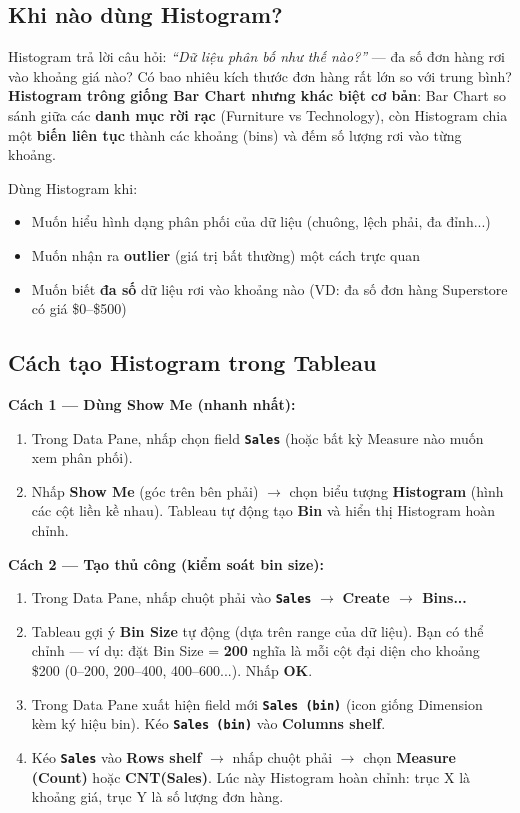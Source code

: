\documentclass[12pt]{article}
\begin{document}
\subsection{Khi nào dùng Histogram?}

\noindent Histogram trả lời câu hỏi: \textit{``Dữ liệu phân bố như thế nào?''} --- đa số đơn hàng rơi vào khoảng giá nào? Có bao nhiêu kích thước đơn hàng rất lớn so với trung bình? \textbf{Histogram trông giống Bar Chart nhưng khác biệt cơ bản}: Bar Chart so sánh giữa các \textbf{danh mục rời rạc} (Furniture vs Technology), còn Histogram chia một \textbf{biến liên tục} thành các khoảng (bins) và đếm số lượng rơi vào từng khoảng.

\noindent Dùng Histogram khi:
\begin{itemize}[nosep]
    \item Muốn hiểu hình dạng phân phối của dữ liệu (chuông, lệch phải, đa đỉnh...)
    \item Muốn nhận ra \textbf{outlier} (giá trị bất thường) một cách trực quan
    \item Muốn biết \textbf{đa số} dữ liệu rơi vào khoảng nào (VD: đa số đơn hàng Superstore có giá \$0--\$500)
\end{itemize}

\subsection{Cách tạo Histogram trong Tableau}

\noindent \textbf{Cách 1 --- Dùng Show Me (nhanh nhất):}
\begin{enumerate}[nosep]
    \item Trong Data Pane, nhấp chọn field \textbf{\texttt{Sales}} (hoặc bất kỳ Measure nào muốn xem phân phối).
    \item Nhấp \textbf{Show Me} (góc trên bên phải) $\rightarrow$ chọn biểu tượng \textbf{Histogram} (hình các cột liền kề nhau). Tableau tự động tạo \textbf{Bin} và hiển thị Histogram hoàn chỉnh.
\end{enumerate}

\noindent \textbf{Cách 2 --- Tạo thủ công (kiểm soát bin size):}
\begin{enumerate}[nosep]
    \item Trong Data Pane, nhấp chuột phải vào \textbf{\texttt{Sales}} $\rightarrow$ \textbf{Create $\rightarrow$ Bins...}
    \item Tableau gợi ý \textbf{Bin Size} tự động (dựa trên range của dữ liệu). Bạn có thể chỉnh --- ví dụ: đặt Bin Size = \textbf{200} nghĩa là mỗi cột đại diện cho khoảng \$200 (0--200, 200--400, 400--600...). Nhấp \textbf{OK}.
    \item Trong Data Pane xuất hiện field mới \textbf{\texttt{Sales (bin)}} (icon giống Dimension kèm ký hiệu bin). Kéo \textbf{\texttt{Sales (bin)}} vào \textbf{Columns shelf}.
    \item Kéo \textbf{\texttt{Sales}} vào \textbf{Rows shelf} $\rightarrow$ nhấp chuột phải $\rightarrow$ chọn \textbf{Measure (Count)} hoặc \textbf{CNT(Sales)}. Lúc này Histogram hoàn chỉnh: trục X là khoảng giá, trục Y là số lượng đơn hàng.
\end{enumerate}
\end{document}
